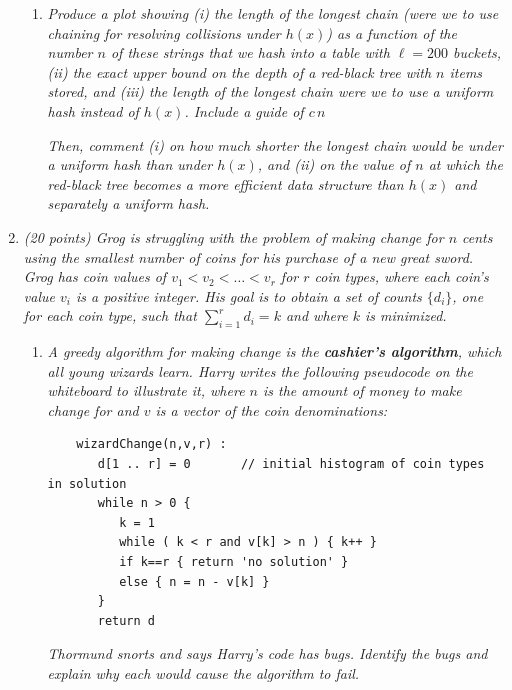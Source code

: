 \documentclass[12pt]{article}
\begin{document}
\begin{enumerate}
\begin{enumerate}
    	
    	\item\textit{  Produce a plot showing (i) the length of the longest chain (were we to use chaining for resolving collisions under $h(x)$) as a function of the number $n$ of these strings that we hash into a table with $\ell=200$ buckets, (ii) the exact upper bound on the depth of a red-black tree with $n$ items stored, and (iii) the length of the longest chain were we to use a uniform hash instead of $h(x)$. Include a guide of $c\,n$}
    	
    	\textit{ Then, comment (i) on how much shorter the longest chain would be under a uniform hash than under $h(x)$, and (ii) on the value of $n$ at which the red-black tree becomes a more efficient data structure than $h(x)$ and separately a uniform hash.}
	\end{enumerate}
	
\newpage

	\item \textit{ (20 points) Grog is struggling with the problem of making change for $n$ cents using the smallest number of coins for his purchase of a new great sword. Grog has coin values of $v_{1}<v_{2}<\dots<v_{r}$ for $r$ coin types, where each coin's value $v_{i}$ is a positive integer. His goal is to obtain a set of counts $\{d_{i}\}$, one for each coin type, such that $\sum_{i=1}^{r}d_{i}=k$ and where $k$ is minimized.}
	\begin{enumerate}
	\item \textit{ A greedy algorithm for making change is the \textbf{cashier's algorithm}, which all young wizards learn. Harry writes the following pseudocode on the whiteboard to illustrate it, where $n$ is the amount of money to make change for and $v$ is a vector of the coin denominations:}
	\begin{small}
	\begin{verbatim}
	wizardChange(n,v,r) :
	   d[1 .. r] = 0       // initial histogram of coin types in solution
	   while n > 0 {
	      k = 1
	      while ( k < r and v[k] > n ) { k++ }
	      if k==r { return 'no solution' }
	      else { n = n - v[k] }
	   }
	   return d
	\end{verbatim}
	\end{small}
	\textit{ Thormund snorts and says Harry's code has bugs. Identify the bugs and explain why each would cause the algorithm to fail.}


\end{enumerate}
\end{enumerate}
\end{document}
